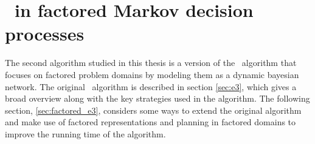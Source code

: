\section{\etre\ in factored Markov decision processes}
\label{sec:fac_e3}

The second algorithm studied in this thesis is a version of the \etre\ algorithm that focuses on factored problem domains by modeling them as a dynamic bayesian network. The original \etre\ algorithm is described in section \ref{sec:e3}, which gives a broad overview along with the key strategies used in the algorithm. The following section, \ref{sec:factored_e3}, considers some ways to extend the original algorithm and make use of factored representations and planning in factored domains to improve the running time of the algorithm.



